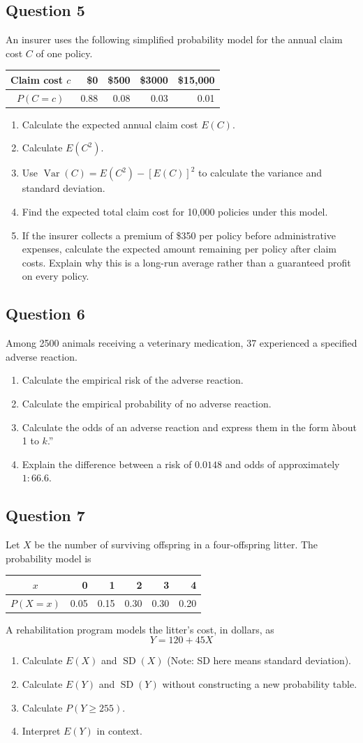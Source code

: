 \documentclass[10pt,letterpaper]{article}
\newcommand{\questionheading}[1]{%
  \subsection*{Question #1}
}
\begin{document}
\questionheading{5}
An insurer uses the following simplified probability model for the annual claim cost $C$ of one policy.
\begin{center}
\begin{tabular}{c*{4}{r}}
\toprule
Claim cost $c$ & \$0 & \$500 & \$3000 & \$15,000 \\
\midrule
$P(C=c)$ & 0.88 & 0.08 & 0.03 & 0.01 \\
\bottomrule
\end{tabular}
\end{center}
\begin{enumerate}
	\item Calculate the expected annual claim cost $E(C)$.
	\item Calculate $E(C^2)$.
	\item Use $\operatorname{Var}(C)=E(C^2)-[E(C)]^2$ to calculate the variance and standard deviation.
	\item Find the expected total claim cost for 10,000 policies under this model.
	\item If the insurer collects a premium of \$350 per policy before administrative expenses, calculate the expected amount remaining per policy after claim costs. Explain why this is a long-run average rather than a guaranteed profit on every policy.
\end{enumerate}

\questionheading{6}
Among 2500 animals receiving a veterinary medication, 37 experienced a specified adverse reaction.
\begin{enumerate}
	\item Calculate the empirical risk of the adverse reaction.
	\item Calculate the empirical probability of no adverse reaction.
	\item Calculate the odds of an adverse reaction and express them in the form \`\`about 1 to $k$.''
	\item Explain the difference between a risk of $0.0148$ and odds of approximately $1:66.6$.
\end{enumerate}

\questionheading{7}
Let $X$ be the number of surviving offspring in a four-offspring litter. The probability model is
\begin{center}
\begin{tabular}{c*{5}{r}}
\toprule
$x$ & 0 & 1 & 2 & 3 & 4 \\
\midrule
$P(X=x)$ & 0.05 & 0.15 & 0.30 & 0.30 & 0.20 \\
\bottomrule
\end{tabular}
\end{center}
A rehabilitation program models the litter's cost, in dollars, as
\[
	Y=120+45X
\]
\begin{enumerate}
	\item Calculate $E(X)$ and $\operatorname{SD}(X)$ (Note: SD here means standard deviation).
	\item Calculate $E(Y)$ and $\operatorname{SD}(Y)$ without constructing a new probability table.
	\item Calculate $P(Y\geq255)$.
	\item Interpret $E(Y)$ in context.
\end{enumerate}
\end{document}
